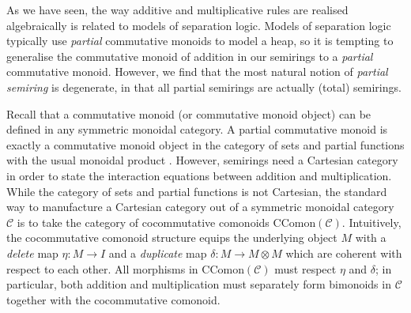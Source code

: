 As we have seen, the way additive and multiplicative rules are
realised algebraically is related to models of separation logic.
Models of separation logic typically use \emph{partial} commutative monoids to
model a heap, so it is tempting to generalise the commutative monoid of
addition in our semirings to a \emph{partial} commutative monoid.
However, we find that the most natural notion of \emph{partial semiring} is
degenerate, in that all partial semirings are actually (total) semirings.

Recall that a commutative monoid (or commutative monoid object) can be
defined in any symmetric monoidal category.
A partial commutative monoid is exactly a commutative monoid object in the
category of sets and partial functions with the usual monoidal product
.
However, semirings need a Cartesian category in order to state the interaction
equations between addition and multiplication.
While the category of sets and partial functions is not Cartesian, the
standard way to manufacture a Cartesian category out of a symmetric monoidal
category $\mathcal C$ is to take the category of cocommutative comonoids
$\mathrm{CComon}(\mathcal C)$.
Intuitively, the cocommutative comonoid structure equips the underlying
object $M$ with a \emph{delete} map $\eta : M \to I$ and a \emph{duplicate}
map $\delta : M \to M \otimes M$ which are coherent with respect to each other.
All morphisms in $\mathrm{CComon}(\mathcal C)$ must respect $\eta$ and
$\delta$; in particular, both addition and multiplication must separately
form bimonoids in $\mathcal C$ together with the cocommutative comonoid.

